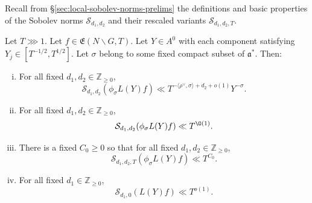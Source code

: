 Recall from  \S\ref{sec:local-sobolev-norms-prelims} the definitions and basic properties of the Sobolev norms $\mathcal{S}_{d_1,d_2}$ and their rescaled variants $\mathcal{S}_{d_1,d_2,T}$.

\begin{lemma}\label{lem:lemma-Sobolev-estimates-frakE}
  Let $T \ggg 1$.  Let $f \in \mathfrak{E}(N \backslash G, T)$.  Let $Y \in A^0$ with each component satisfying $Y_j \in [T^{-1/2}, T^{1/2}]$.  Let $\sigma$ belong to some fixed compact subset of $\mathfrak{a}^*$.  Then:
  \begin{enumerate}[(i)]
  \item \label{item:sobolev-frakE-0} For all fixed $d_1,d_2 \in \mathbb{Z}_{\geq 0}$,
    \begin{equation}\label{eq:mathc-d_2-phi_s}
      \mathcal{S}_{d_1,d_2} \left(\phi_{\sigma} L(Y) f\right) \ll T^{- \langle \rho^\vee , \sigma  \rangle + d_2 + o(1)} Y^{-\sigma}.
    \end{equation}
  \item \label{item:sobolev-frakE-1} For all fixed $d_1, d_2 \in \mathbb{Z}_{\geq 0}$,
    \begin{equation}\label{eq:mathc-d_2-det_m}
      \mathcal{S}_{d_1,d_2} (\phi_\sigma  L(Y) f) \ll T^{\O(1)}.
    \end{equation}
  \item \label{item:sobolev-frakE-2} There is a fixed $C_0 \geq 0$ so that for all fixed $d_1, d_2 \in \mathbb{Z}_{\geq 0}$,
    \begin{equation*}
      \mathcal{S}_{d_1,d_2,T} (\phi_{\sigma} L(Y) f) \ll T^{C_0}.
    \end{equation*}
  \item \label{item:sobolev-frakE-3} For all fixed $d_1 \in \mathbb{Z}_{\geq 0}$,
    \begin{equation*}
      \mathcal{S}_{d_1,0}(L(Y) f) \ll T^{o(1)}.
    \end{equation*}
  \end{enumerate}
\end{lemma}
